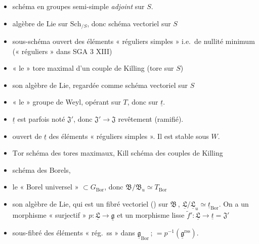 \documentclass[11pt,a4paper]{article}
\begin{document}
\begin{itemize}
\item[$G$] schéma en groupes semi-simple \emph{adjoint} sur $S$.
\item[$\underline{\mathfrak{g}}$] algèbre de Lie  sur
$\mathrm{Sch}_{/S}$, donc schéma vectoriel sur $S$
\item[$\underline{\mathfrak{g}}^{\mathrm{rss}}$] sous-schéma ouvert des
éléments « réguliers simples » i.e.\ de nullité minimum
(« réguliers » dans SGA 3 XIII)
\item[$T$] « le » tore maximal d'un couple de Killing (tore sur $S$)
\item[$\underline{t}$] son algèbre de Lie, regardée comme schéma vectoriel
sur $S$
\item[$W$] « le » groupe de Weyl, opérant sur $T$, donc sur $\underline{t}$.
\item[$\mathfrak{J}=\underline{t}/W$\,;] $\underline{t}$ est parfois noté
$\mathfrak{J}'$, donc $\mathfrak{J}'\to\mathfrak{J}$ revêtement (ramifié).
\item[$\underline{t}^{\mathrm{rss}}$] ouvert de $\underline{t}$ des éléments
« réguliers simples ». Il est stable sous $W$.
\item[$\mathfrak{J}^{\mathrm{rss}}=\underline{t}^{\mathrm{rss}}/W$\,;]
$\mathrm{Tor}$ schéma des tores maximaux, $\mathrm{Kill}$ schéma des couples
de Killing
\item[$\mathrm{Bor}$] schéma des  Borels,
\item[$\mathfrak{B}$] le « Borel universel » $\subset G_{\mathrm{Bor}}$, donc
$\mathfrak{B}/\mathfrak{B}_u\simeq T_{\mathrm{Bor}}$
\item[$\underline{\mathfrak{L}}$] son algèbre de Lie, qui est un fibré
vectoriel () sur $\mathfrak{B}$\,,
$\underline{\mathfrak{L}}/\underline{\mathfrak{L}}_u\simeq
\underline{t}_{\mathrm{Bor}}$. On a un morphisme « surjectif »
$p\colon\underline{\mathfrak{L}}\to\underline{\mathfrak{g}}$ et un morphisme
lisse $\tilde f'\colon\underline{\mathfrak{L}}\to\underline{t}=\mathfrak{J}'$
\item[$\underline{\mathfrak{L}}^{\mathrm{rss}}$] sous-fibré des éléments
« rég.\ ss » dans $\underline{\mathfrak{g}}_{\mathrm{Bor}}$\,;
$=p^{-1}(\underline{\mathfrak{g}}^{\mathrm{rss}})$.
\end{itemize}
\end{document}

